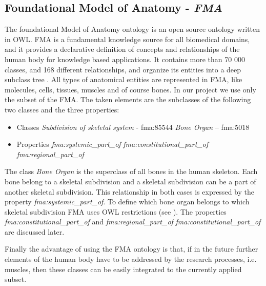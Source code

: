 \subsection{Foundational Model of Anatomy - \textit{FMA}}  \label{fma}

The foundational Model of Anatomy ontology is an open source ontology written in OWL. FMA is a fundamental knowledge source for all biomedical domains, and it provides a declarative definition of concepts and relationships of the human body for knowledge based applications. It contains more than 70 000 classes, and 168 different relationships, and organize its entities into a deep subclass tree \cite{Rosse2003478}. All types of anatomical entities are represented in FMA, like molecules, cells, tissues, muscles and of course bones. In our project we use only the subset of the FMA. The taken elements are the subclasses of the following two classes and the three properties: 

\begin{itemize}
	\item{Classes}
		\subitem \textit{Subdivision of skeletal system} - fma:85544 
		\subitem \textit{Bone Organ} – fma:5018
\end{itemize}

\begin{itemize}
	\item{Properties}
		\subitem \textit{fma:systemic\_part\_of}
		\subitem \textit{fma:constitutional\_part\_of}
		\subitem \textit{fma:regional\_part\_of}
\end{itemize}

The class \textit{Bone Organ} is the superclass of all bones in the human skeleton. Each bone belong to a skeletal subdivision and a skeletal subdivision can be a part of another skeletal subdivision. This relationship in both cases is expressed by the property \textit{fma:systemic\_part\_of}. To define which bone organ belongs to which skeletal subdivision FMA uses OWL restrictions (see ). The properties \textit{fma:constitutional\_part\_of} and \textit{fma:regional\_part\_of} \textit{fma:constitutional\_part\_of} are discussed later.


Finally the advantage of using the FMA ontology is that, if in the future further elements of the human body have to be addressed by the research processes, i.e. muscles, then these classes can be easily integrated to the currently applied subset.


